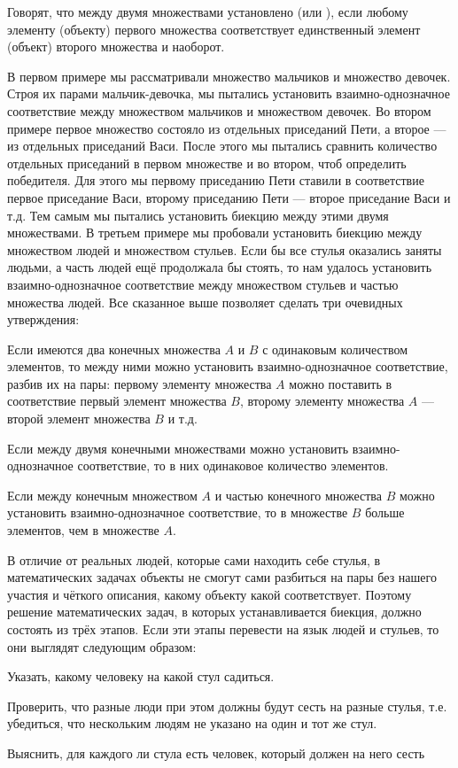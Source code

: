 \documentclass[12pt,a4paper]{article}
\begin{document}
{
Говорят, что между двумя множествами установлено  (или ),
если любому элементу (объекту) первого множества соответствует единственный элемент (объект) второго множества и наоборот.

В первом примере мы рассматривали множество мальчиков и множество девочек.
Строя их парами мальчик-девочка, мы пытались установить взаимно-однозначное соответствие между множеством мальчиков и множеством девочек.
Во втором примере первое множество состояло из отдельных приседаний Пети, а второе — из отдельных приседаний Васи.
После этого мы пытались сравнить количество отдельных приседаний в первом множестве и во втором, чтоб определить победителя.
Для этого мы первому приседанию Пети ставили в соответствие первое приседание Васи, второму приседанию Пети — второе приседание Васи и т.д.
Тем самым мы пытались установить биекцию между этими двумя множествами.
В третьем примере мы пробовали установить биекцию между множеством людей и множеством стульев.
Если бы все стулья оказались заняты людьми, а часть людей ещё продолжала бы стоять,
то нам удалось установить взаимно-однозначное соответствие между множеством стульев и частью множества людей.
Все сказанное выше позволяет сделать три очевидных утверждения:

Если имеются два конечных множества $A$ и $B$ с одинаковым количеством элементов,
то между ними можно установить взаимно-однозначное соответствие, разбив их на пары:
первому элементу множества $A$ можно поставить в соответствие первый элемент множества $B$,
второму элементу множества $A$ — второй элемент множества $B$ и т.д.

Если между двумя конечными множествами можно установить взаимно-однознач\-ное соответствие, то в них одинаковое количество элементов.

Если между конечным множеством $A$ и частью конечного множества $B$ можно установить взаимно-однозначное соответствие,
то в множестве $B$ больше элементов, чем в множестве $A$.

В отличие от реальных людей, которые сами находить себе стулья, в математических задачах объекты не смогут сами разбиться на пары без нашего участия и чёткого описания, какому объекту какой соответствует.
Поэтому решение математических задач, в которых устанавливается биекция, должно состоять из трёх этапов.
Если эти этапы перевести на язык людей и стульев, то они выглядят следующим образом:
\begin{nums}{-3}
\item Указать, какому человеку на какой стул садиться.
\item Проверить, что разные люди при этом должны будут сесть на разные стулья, т.е. убедиться, что нескольким людям не указано на один и тот же стул.
\item Выяснить, для каждого ли стула есть человек, который должен на него сесть
\end{nums}


} %
\end{document}
